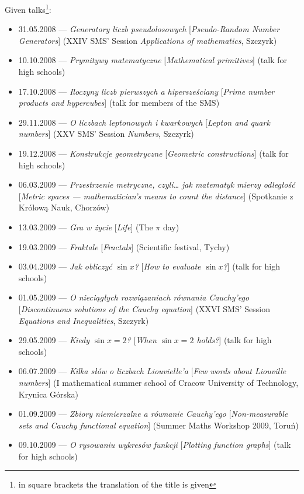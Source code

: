 \noindent Given talks\footnote{in square brackets the translation of the title is given}:
\begin{itemize}
  \item 31.05.2008 --- \textsl{Generatory liczb pseudolosowych} [\textsl{Pseudo-Random Number Generators}] (XXIV SMS' Session \textsl{Applications of mathematics}, Szczyrk)
  \item 10.10.2008 --- \textsl{Prymitywy matematyczne} [\textsl{Mathematical primitives}] (talk for high schools)
  \item 17.10.2008 --- \textsl{Iloczyny liczb pierwszych a hipersześciany} [\textsl{Prime number products and hypercubes}] (talk for members of the SMS)
  \item 29.11.2008 --- \textsl{O liczbach leptonowych i kwarkowych} [\textsl{Lepton and quark numbers}] (XXV SMS' Session \textsl{Numbers}, Szczyrk)
  \item 19.12.2008 --- \textsl{Konstrukcje geometryczne} [\textsl{Geometric constructions}] (talk for high schools)
  \item 06.03.2009 --- \textsl{Przestrzenie metryczne, czyli\ldots{} jak matematyk mierzy odległość} [\textsl{Metric spaces --- mathematician's means to count the distance}] (Spotkanie z Królową Nauk, Chorzów)
  \item 13.03.2009 --- \textsl{Gra w życie} [\textsl{Life}] (The $\pi$ day)
  \item 19.03.2009 --- \textsl{Fraktale} [\textsl{Fractals}] (Scientific festival, Tychy)
  \item 03.04.2009 --- \textsl{Jak obliczyć $\sin x$?} [\textsl{How to evaluate $\sin x$?}] (talk for high schools)
  \item 01.05.2009 --- \textsl{O nieciągłych rozwiązaniach równania Cauchy'ego} [\textsl{Discontinuous solutions of the Cauchy equation}] (XXVI SMS' Session \textsl{Equations and Inequalities}, Szczyrk)
  \item 29.05.2009 --- \textsl{Kiedy $\sin x=2$?} [\textsl{When $\sin x=2$ holds?}] (talk for high schools)
  \item 06.07.2009 --- \textsl{Kilka słów o liczbach Liouvielle'a} [\textsl{Few words about Liouville numbers}] (I mathematical summer school of Cracow University of Technology, Krynica Górska)
  \item 01.09.2009 --- \textsl{Zbiory niemierzalne a równanie Cauchy'ego} [\textsl{Non-measurable sets and Cauchy functional equation}] (Summer Maths Workshop 2009, Toruń)
  \item 09.10.2009 --- \textsl{O rysowaniu wykresów funkcji} [\textsl{Plotting function graphs}] (talk for high schools)

\end{itemize}
